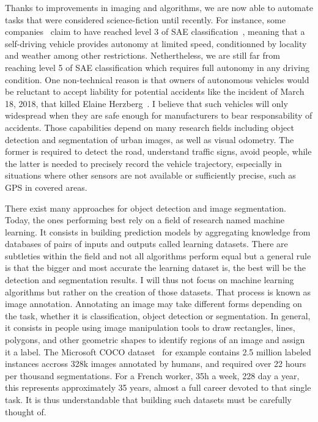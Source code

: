 Thanks to improvements in imaging and algorithms,
we are now able to automate tasks that were considered science-fiction until recently.
For instance, some companies~\cite{audia8} claim to have reached level 3
of SAE classification~\cite{sae-cars},
meaning that a self-driving vehicle provides autonomy at limited speed,
conditionned by locality and weather among other restrictions.
Nethertheless, we are still far from reaching level 5 of SAE classification
which requires full autonomy in any driving condition.
One non-technical reason is that owners of autonomous vehicles would be reluctant
to accept liability for potential accidents like the incident
of March 18, 2018, that killed Elaine Herzberg~\cite{elaineherzberg}.
I believe that such vehicles will only widespread when they are
safe enough for manufacturers to bear responsability of accidents.
Those capabilities depend on many research fields
including object detection and segmentation of urban images,
as well as visual odometry.
The former is required to detect the road, understand traffic signs,
avoid people, while the latter is needed to precisely record
the vehicle trajectory, especially in situations where other sensors
are not available or sufficiently precise, such as GPS in covered areas.

There exist many approaches for object detection and image segmentation.
Today, the ones performing best rely on a field of research named machine learning.
It consists in building prediction models by aggregating knowledge
from databases of pairs of inputs and outputs called learning datasets.
There are subtleties within the field
and not all algorithms perform equal but a general rule is that
the bigger and most accurate the learning dataset is,
the best will be the detection and segmentation results.
I will thus not focus on machine learning algorithms
but rather on the creation of those datasets.
That process is known as image annotation.
Annotating an image may take different forms depending on the task,
whether it is classification, object detection or segmentation.
In general, it consists in people using image manipulation tools
to draw rectangles, lines, polygons, and other geometric shapes
to identify regions of an image and assign it a label.
The Microsoft COCO dataset~\cite{lin2014microsoft} for example
contains 2.5 million labeled instances accross 328k images annotated by humans,
and required over 22 hours per thousand segmentations.
For a French worker, 35h a week, 228 day a year, this represents approximately 35 years,
almost a full career devoted to that single task.
It is thus understandable that building such datasets must be carefully thought of.

